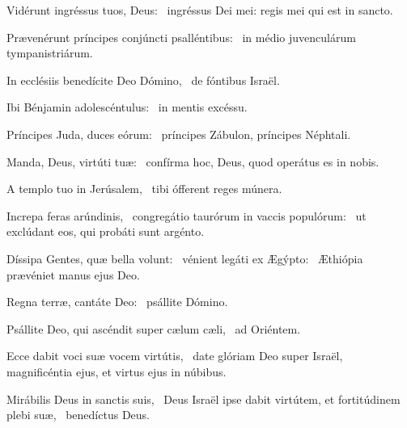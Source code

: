 
\item Vidérunt ingréssus tuos, Deus:~\psstar{} ingréssus Dei mei: regis mei qui est in sancto.

\item Prævenérunt príncipes conjúncti psalléntibus:~\psstar{} in médio juvenculárum tympanistriárum.

\item In ecclésiis benedícite Deo Dómino,~\psstar{} de fóntibus Israël.

\item Ibi Bénjamin adolescéntulus:~\psstar{} in mentis excéssu.

\item Príncipes Juda, duces eórum:~\psstar{} príncipes Zábulon, príncipes Néphtali.

\item Manda, Deus, virtúti tuæ:~\psstar{} confírma hoc, Deus, quod operátus es in nobis.

\item A templo tuo in Jerúsalem,~\psstar{} tibi ófferent reges múnera.

\item Increpa feras arúndinis,~\pscross{} congregátio taurórum in vaccis populórum:~\psstar{} ut exclúdant eos, qui probáti sunt argénto.

\item Díssipa Gentes, quæ bella volunt:~\pscross{} vénient legáti ex Ægýpto:~\psstar{} Æthiópia prævéniet manus ejus Deo.

\item Regna terræ, cantáte Deo:~\psstar{} psállite Dómino.

\item Psállite Deo, qui ascéndit super cælum cæli,~\psstar{} ad Oriéntem.

\item Ecce dabit voci suæ vocem virtútis,~\pscross{} date glóriam Deo super Israël,~\psstar{} magnificéntia ejus, et virtus ejus in núbibus.

\item Mirábilis Deus in sanctis suis,~\pscross{} Deus Israël ipse dabit virtútem, et fortitúdinem plebi suæ,~\psstar{} benedíctus Deus.
